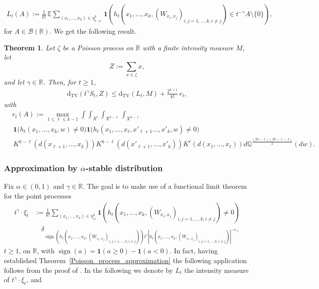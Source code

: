 \documentclass{article}
\newtheorem{theorem}{Theorem}[section]
\theoremstyle{definition}
\numberwithin{equation}{section}
\theoremstyle{remark}
\begin{document}
\begin{align*}
L_t(A) := \frac{1}{k!} \, \mathbb{E} \sum_{(x_1, \ldots, x_k) \in \eta_{t, \neq}^k} 
\mathbf{1}\left( h_t(x_1, \ldots, x_k, (W_{x_i,x_j})_{i,j =1,\ldots, k, i \neq j}) \in t^{-\gamma} A \setminus \{0\} \right),
\end{align*}
for $A \in \mathcal{B}(\mathbb{R})$. We get the following result.

\begin{theorem}\label{compound}
Let \( \zeta \) be a Poisson process on \( \mathbb{R} \) with a finite intensity measure \( M \), let
\[
Z := \sum_{x \in \zeta} x,
\]
and let \( \gamma \in \mathbb{R} \). Then, for \( t \ge 1 \),
\begin{align*}
\mathrm{d}_{\mathrm{TV}}(t^{\gamma} S_t, Z) \le \mathrm{d}_{\mathrm{TV}}(L_t, M) + \frac{2^{k+1}}{k!} \, r_t,
\end{align*}
with
\begin{align*}
  &  r_t(A) := \max_{1 \leq \ell \leq k-1} 
\int \int_{X^\ell}  
\int_{X^{k - \ell}}\int_{X^{k - \ell}} \\
& \, \mathbf{1}\big(  h_t( {x}_1, \ldots, {x}_k , w ) \neq 0  \big) \mathbf{1}\big( h_t( {x}_1, \ldots, {x}_\ell, {x}'_{\ell+1} \ldots, {x}'_{k}, w ) \neq 0 \big) \\
&\,{K}^{k - \ell}(d({x}_{\ell+1}, \ldots, {x}_k))   {K}^{k - \ell}(d({x}'_{\ell+1}, \ldots, {x}'_k)) {K}^\ell(d({x}_1, \ldots, {x}_\ell)) d\mathbb{Q}^{\frac{(2k - \ell) (2k -\ell-1)}{2}} (dw) .
\end{align*}
\end{theorem}








\subsubsection{Approximation by $\alpha$-stable distribution}

Fix $\alpha \in (0, 1)$ and $\gamma \in \mathbb{R}$. The goal is to make use of a functional limit theorem for the point processes
\begin{align*}
    t^\gamma \cdot \xi_t &:= \frac{1}{k!} \sum_{(x_1, \ldots, x_k) \in \eta^k_{\neq}} 
\mathbf{1}(h_t(x_1, \ldots, x_k,(W_{x_i,x_j})_{i,j =1,\ldots, k, i \neq j}) \ne 0) \\
&\quad \delta_{\operatorname{sign}(h_t(x_1, \ldots, x_k,(W_{x_i,x_j})_{i,j =1,\ldots, k, i \neq j})) t^\gamma |h_t(x_1, \ldots, x_k,(W_{x_i,x_j})_{i,j =1,\ldots, k, i \neq j})|^{-\alpha}},
\end{align*}
 $t \ge 1$, on $\mathbb{R}$, with $\operatorname{sign}(a) = \mathbf{1}(a \ge 0) - \mathbf{1}(a < 0)$. In fact, having established Theorem~\ref{Poisson_process_approximation} the following application follows from the proof of \cite[Theorem 7.8]{dst}. In the following we denote by $L_t$ the intensity measure of $t^\gamma \cdot \xi_t$, and
\end{document}
